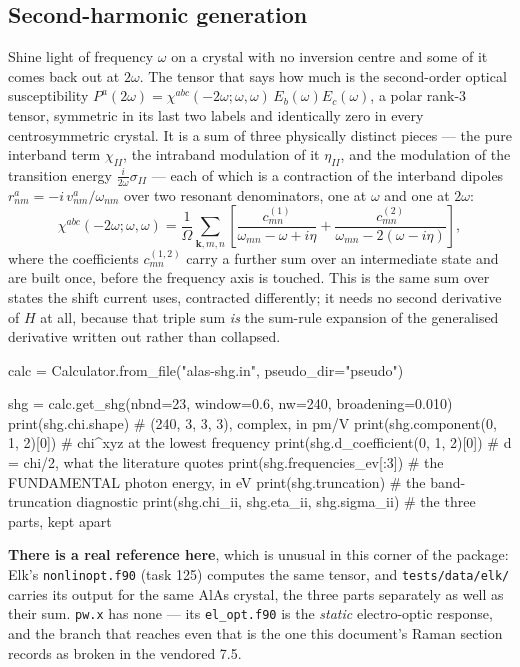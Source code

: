 \documentclass[11pt,a4paper]{article}
\newcommand{\code}[1]{\texttt{\small #1}}
\begin{document}
\subsection{Second-harmonic generation}

Shine light of frequency $\omega$ on a crystal with no inversion centre and some
of it comes back out at $2\omega$. The tensor that says how much is the
second-order optical susceptibility
$P^a(2\omega) = \chi^{abc}(-2\omega;\omega,\omega)\,E_b(\omega)E_c(\omega)$, a
polar rank-3 tensor, symmetric in its last two labels and identically zero in
every centrosymmetric crystal. It is a sum of three physically distinct pieces
--- the pure interband term $\chi_{II}$, the intraband modulation of it
$\eta_{II}$, and the modulation of the transition energy
$\tfrac{i}{2\omega}\sigma_{II}$ --- each of which is a contraction of the
interband dipoles $r^a_{nm} = -i\,v^a_{nm}/\omega_{nm}$ over two resonant
denominators, one at $\omega$ and one at $2\omega$:
\begin{equation*}
\chi^{abc}(-2\omega;\omega,\omega) = \frac{1}{\Omega}\sum_{\mathbf k, m, n}
  \left[\frac{c^{(1)}_{mn}}{\omega_{mn}-\omega+i\eta}
      + \frac{c^{(2)}_{mn}}{\omega_{mn}-2(\omega-i\eta)}\right],
\end{equation*}
where the coefficients $c^{(1,2)}_{mn}$ carry a further sum over an intermediate
state and are built once, before the frequency axis is touched. This is the same
sum over states the shift current uses, contracted differently; it needs no
second derivative of $H$ at all, because that triple sum \emph{is} the sum-rule
expansion of the generalised derivative written out rather than collapsed.

\begin{pycode}
calc = Calculator.from_file("alas-shg.in", pseudo_dir="pseudo")

shg = calc.get_shg(nbnd=23, window=0.6, nw=240, broadening=0.010)
print(shg.chi.shape)                  # (240, 3, 3, 3), complex, in pm/V
print(shg.component(0, 1, 2)[0])       # chi^xyz at the lowest frequency
print(shg.d_coefficient(0, 1, 2)[0])   # d = chi/2, what the literature quotes
print(shg.frequencies_ev[:3])          # the FUNDAMENTAL photon energy, in eV
print(shg.truncation)                  # the band-truncation diagnostic
print(shg.chi_ii, shg.eta_ii, shg.sigma_ii)   # the three parts, kept apart
\end{pycode}

\textbf{There is a real reference here}, which is unusual in this corner of the
package: Elk's \code{nonlinopt.f90} (task 125) computes the same tensor, and
\code{tests/data/elk/} carries its output for the same AlAs crystal, the three
parts separately as well as their sum. \code{pw.x} has none --- its
\code{el\_opt.f90} is the \emph{static} electro-optic response, and the branch
that reaches even that is the one this document's Raman section records as
broken in the vendored 7.5.
\end{document}
